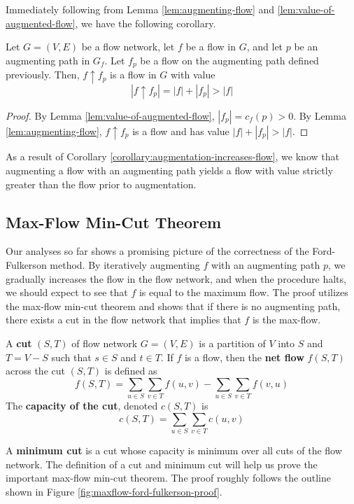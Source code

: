 Immediately following from Lemma \ref{lem:augmenting-flow} and \ref{lem:value-of-augmented-flow}, we have the following corollary.

\begin{corollary} \label{corollary:augmentation-increases-flow}
    Let $G=(V,E)$ be a flow network, let $f$ be a flow in $G$, and let $p$ be an augmenting path in $G_f$. Let $f_p$ be a flow on the augmenting path defined previously. Then, $f \uparrow f_p$ is a flow in $G$ with value
    $$
    |f \uparrow f_p| = |f| + |f_p| > |f|
    $$
\end{corollary}

\begin{proof}
    By Lemma \ref{lem:value-of-augmented-flow}, $|f_p| = c_f(p) > 0$. By Lemma \ref{lem:augmenting-flow}, $f \uparrow f_p$ is a flow and has value $|f|+|f_p| > |f|$.
\end{proof}

As a result of Corollary \ref{corollary:augmentation-increases-flow}, we know that augmenting a flow with an augmenting path yields a flow with value strictly greater than the flow prior to augmentation.

\subsection{Max-Flow Min-Cut Theorem}

Our analyses so far shows a promising picture of the correctness of the Ford-Fulkerson method. By iteratively augmenting $f$ with an augmenting path $p$, we gradually increases the flow in the flow network, and when the procedure halts, we should expect to see that $f$ is equal to the maximum flow. The proof utilizes the max-flow min-cut theorem and shows that if there is no augmenting path, there exists a cut in the flow network that implies that $f$ is the max-flow.

\begin{definition}  
    A \textbf{cut} $(S,T)$ of flow network $G=(V,E)$ is a partition of $V$ into $S$ and $T=V-S$ such that $s \in S$ and $t \in T$. If $f$ is a flow, then the \textbf{net flow} $f(S,T)$ across the cut $(S,T)$ is defined as
    $$
    f(S,T) = \sum_{u \in S}\sum_{v \in T} f(u,v) - \sum_{u \in S}\sum_{v \in T} f(v,u)
    $$
    The \textbf{capacity of the cut}, denoted $c(S,T)$ is
    $$
    c(S,T) = \sum_{u \in S}\sum_{v \in T} c(u,v)
    $$
\end{definition}
A \textbf{minimum cut} is a cut whose capacity is minimum over all cuts of the flow network. The definition of a cut and minimum cut will help us prove the important max-flow min-cut theorem. The proof roughly follows the outline shown in Figure \ref{fig:maxflow-ford-fulkerson-proof}.

